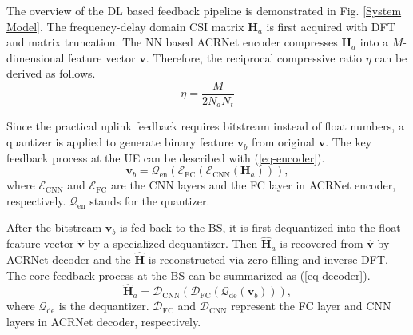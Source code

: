 \documentclass[12pt, draftclsnofoot, onecolumn]{IEEEtran}
\begin{document}
The overview of the DL based feedback pipeline is demonstrated in Fig. \ref{System Model}. The frequency-delay domain CSI matrix $\mathbf{H}_a$ is first acquired with DFT and matrix truncation. The NN based ACRNet encoder compresses $\mathbf{H}_a$ into a $M$-dimensional feature vector $\mathbf{v}$. Therefore, the reciprocal compressive ratio $\eta$ can be derived as follows.
\begin{equation} \label{eq-eta}
  \eta = \frac{M}{2N_aN_t}
\end{equation}

Since the practical uplink feedback requires bitstream instead of float numbers, a quantizer is applied to generate binary feature $\mathbf{v}_b$ from original $\mathbf{v}$. The key feedback process at the UE can be described with (\ref{eq-encoder}).
\begin{equation} \label{eq-encoder}
  \mathbf{v}_b = \mathcal{Q}_\text{en}\left(\mathcal{E}_{\text{FC}}(\mathcal{E}_{\text{CNN}}(\mathbf{H}_a))\right),
\end{equation}
where $\mathcal{E}_{\text{CNN}}$ and $\mathcal{E}_{\text{FC}}$ are the CNN layers and the FC layer in ACRNet encoder, respectively. $\mathcal{Q}_\text{en}$ stands for the quantizer.

After the bitstream $\mathbf{v}_b$ is fed back to the BS, it is first dequantized into the float feature vector $\hat{\mathbf{v}}$ by a specialized dequantizer. Then $\hat{\mathbf{H}}_a$ is recovered from $\hat{\mathbf{v}}$ by ACRNet decoder and the $\hat{\mathbf{H}}$ is reconstructed via zero filling and inverse DFT. The core feedback process at the BS can be summarized as (\ref{eq-decoder}).
\begin{equation} \label{eq-decoder}
  \hat{\mathbf{H}}_a = \mathcal{D}_{\text{CNN}}(\mathcal{D}_{\text{FC}}(\mathcal{Q}_\text{de}(\mathbf{v}_b))),
\end{equation}
where $\mathcal{Q}_\text{de}$ is the dequantizer. $\mathcal{D}_{\text{FC}}$ and $\mathcal{D}_{\text{CNN}}$ represent the FC layer and CNN layers in ACRNet decoder, respectively.

\end{document}
